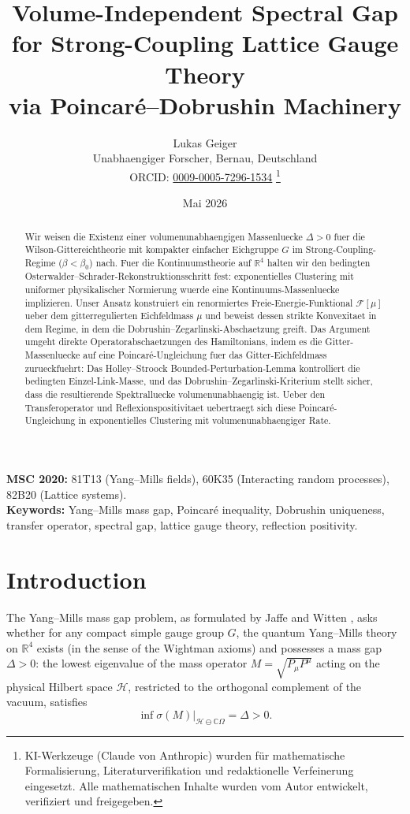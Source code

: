 \documentclass[12pt,a4paper]{article}
\title{\textbf{Volume-Independent Spectral Gap for Strong-Coupling Lattice Gauge Theory\\ via Poincar\'e--Dobrushin Machinery}}
\author{Lukas Geiger\\
\small Unabhaengiger Forscher, Bernau, Deutschland\\
\small ORCID: \href{https://orcid.org/0009-0005-7296-1534}{0009-0005-7296-1534}%
\thanks{KI-Werkzeuge (Claude von Anthropic) wurden für mathematische Formalisierung, Literaturverifikation und redaktionelle Verfeinerung eingesetzt. Alle mathematischen Inhalte wurden vom Autor entwickelt, verifiziert und freigegeben.}}
\date{Mai 2026}
\theoremstyle{definition}
\theoremstyle{plain}
\theoremstyle{remark}
\begin{document}
\maketitle

\noindent\textbf{MSC 2020:} 81T13 (Yang--Mills fields), 60K35 (Interacting random processes), 82B20 (Lattice systems).\\
\textbf{Keywords:} Yang--Mills mass gap, Poincar\'e inequality, Dobrushin uniqueness, transfer operator, spectral gap, lattice gauge theory, reflection positivity.

\begin{abstract}
Wir weisen die Existenz einer volumenunabhaengigen Massenluecke $\Delta > 0$ fuer die Wilson-Gittereichtheorie mit kompakter einfacher Eichgruppe $G$ im Strong-Coupling-Regime ($\beta < \beta_0$) nach. Fuer die Kontinuumstheorie auf $\mathbb{R}^4$ halten wir den bedingten Osterwalder--Schrader-Rekonstruktionsschritt fest: exponentielles Clustering mit uniformer physikalischer Normierung wuerde eine Kontinuums-Massenluecke implizieren. Unser Ansatz konstruiert ein renormiertes Freie-Energie-Funktional $\mathcal{F}[\mu]$ ueber dem gitterregulierten Eichfeldmass $\mu$ und beweist dessen strikte Konvexitaet in dem Regime, in dem die Dobrushin--Zegarlinski-Abschaetzung greift. Das Argument umgeht direkte Operatorabschaetzungen des Hamiltonians, indem es die Gitter-Massenluecke auf eine Poincar\'e-Ungleichung fuer das Gitter-Eichfeldmass zurueckfuehrt: Das Holley--Stroock Bounded-Perturbation-Lemma kontrolliert die bedingten Einzel-Link-Masse, und das Dobrushin--Zegarlinski-Kriterium stellt sicher, dass die resultierende Spektralluecke volumenunabhaengig ist. Ueber den Transferoperator und Reflexionspositivitaet uebertraegt sich diese Poincar\'e-Ungleichung in exponentielles Clustering mit volumenunabhaengiger Rate.
\end{abstract}

\clearpage
\tableofcontents
\clearpage

\section{Introduction}

The Yang--Mills mass gap problem, as formulated by Jaffe and Witten \cite{JaffeWitten2000}, asks whether for any compact simple gauge group $G$, the quantum Yang--Mills theory on $\mathbb{R}^4$ exists (in the sense of the Wightman axioms) and possesses a mass gap $\Delta > 0$: the lowest eigenvalue of the mass operator $M = \sqrt{P_\mu P^\mu}$ acting on the physical Hilbert space $\mathcal{H}$, restricted to the orthogonal complement of the vacuum, satisfies
\begin{equation}
    \inf \sigma(M)\big|_{\mathcal{H} \ominus \mathbb{C}\Omega} = \Delta > 0.
\end{equation}
\end{document}
